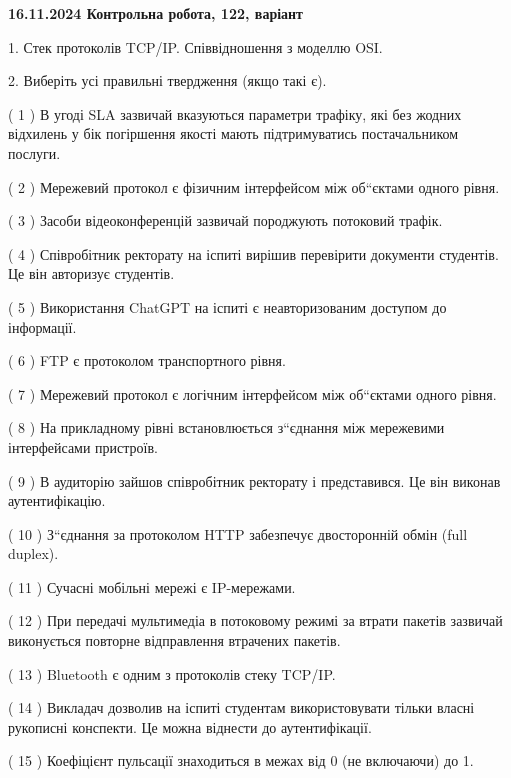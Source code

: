 \documentclass[12pt, ukrainian]{article}
\begin{document}
\vspace{4mm}
\newpage
\begin {large}

\textbf{16.11.2024 Контрольна робота, 122, варіант  }\par


{
1. Стек протоколів TCP/IP. Співвідношення з моделлю OSI.



\vspace{5mm}
2. Виберіть усі правильні твердження (якщо такі є).\par
\vspace{2mm}

( 1 ) В угоді SLA зазвичай вказуються параметри трафіку, які без жодних відхилень у бік погіршення якості мають підтримуватись постачальником послуги.

( 2 ) Мережевий протокол є фізичним інтерфейсом між об“єктами одного рівня.

( 3 ) Засоби відеоконференцій зазвичай породжують потоковий трафік.

( 4 ) Співробітник ректорату на іспиті вирішив перевірити документи студентів. Це він авторизує студентів.

( 5 ) Використання ChatGPT на іспиті є неавторизованим доступом до інформації.

( 6 ) FTP є протоколом транспортного рівня.

( 7 ) Мережевий протокол є логічним інтерфейсом між об“єктами одного рівня.

( 8 ) На прикладному рівні встановлюється з“єднання між мережевими інтерфейсами пристроїв.

( 9 ) В аудиторію зайшов співробітник ректорату і представився. Це він виконав аутентифікацію.

( 10 ) З“єднання за протоколом  HTTP забезпечує двосторонній обмін (full duplex).

( 11 ) Сучасні мобільні мережі є IP-мережами.

( 12 ) При передачі мультимедіа в потоковому режимі за втрати пакетів зазвичай виконується повторне відправлення втрачених пакетів.

( 13 ) Bluetooth є одним з протоколів стеку TCP/IP.

( 14 ) Викладач дозволив на іспиті студентам використовувати тільки власні рукописні конспекти. Це можна віднести до аутентифікації.

( 15 ) Коефіцієнт пульсації знаходиться в межах від 0 (не включаючи) до 1.
}
\end {large}

\vspace{4mm}
\newpage
\end{document}

